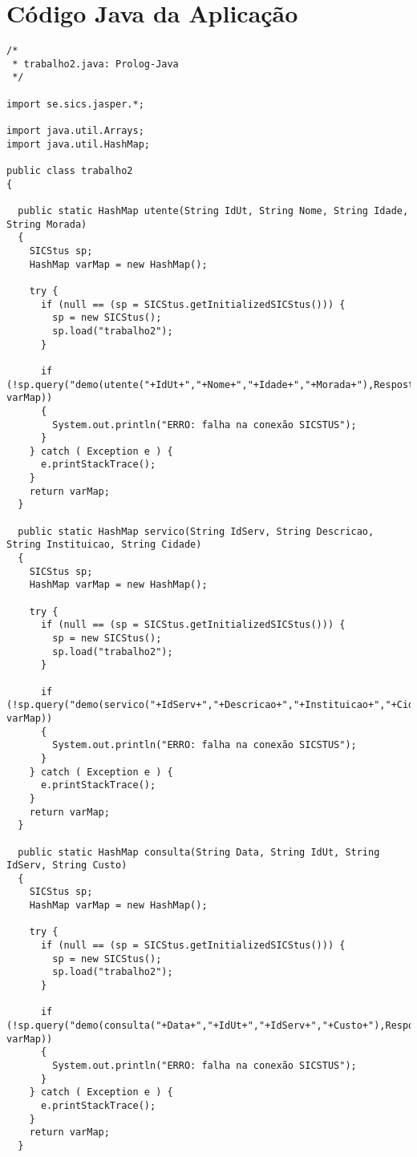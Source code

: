 \documentclass[
  oneside,
  10pt, a4paper,
  footinclude=true,
  headinclude=true,
  cleardoublepage=empty
]{scrbook}
\begin{document}
\newpage

\section{Código Java da Aplicação}
	\label{java}
\begin{lstlisting}	
/*
 * trabalho2.java: Prolog-Java
 */

import se.sics.jasper.*;

import java.util.Arrays;
import java.util.HashMap;

public class trabalho2
{

  public static HashMap utente(String IdUt, String Nome, String Idade, String Morada)
  {
    SICStus sp;
    HashMap varMap = new HashMap();

    try {
      if (null == (sp = SICStus.getInitializedSICStus())) {
        sp = new SICStus();
        sp.load("trabalho2");
      }

      if (!sp.query("demo(utente("+IdUt+","+Nome+","+Idade+","+Morada+"),Resposta).", varMap))
      {
        System.out.println("ERRO: falha na conexão SICSTUS");
      }
    } catch ( Exception e ) {
      e.printStackTrace();
    }
    return varMap;
  }

  public static HashMap servico(String IdServ, String Descricao, String Instituicao, String Cidade)
  {
    SICStus sp;
    HashMap varMap = new HashMap();

    try {
      if (null == (sp = SICStus.getInitializedSICStus())) {
        sp = new SICStus();
        sp.load("trabalho2");
      }

      if (!sp.query("demo(servico("+IdServ+","+Descricao+","+Instituicao+","+Cidade+"),Resposta).", varMap))
      {
        System.out.println("ERRO: falha na conexão SICSTUS");
      }
    } catch ( Exception e ) {
      e.printStackTrace();
    }
    return varMap;
  }

  public static HashMap consulta(String Data, String IdUt, String IdServ, String Custo)
  {
    SICStus sp;
    HashMap varMap = new HashMap();

    try {
      if (null == (sp = SICStus.getInitializedSICStus())) {
        sp = new SICStus();
        sp.load("trabalho2");
      }

      if (!sp.query("demo(consulta("+Data+","+IdUt+","+IdServ+","+Custo+"),Resposta).", varMap))
      {
        System.out.println("ERRO: falha na conexão SICSTUS");
      }
    } catch ( Exception e ) {
      e.printStackTrace();
    }
    return varMap;
  }


\end{lstlisting}
\end{document}
